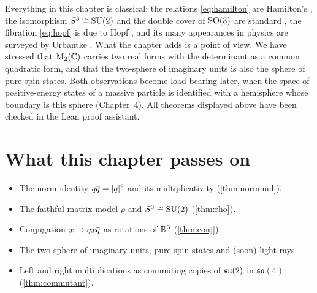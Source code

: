 \begin{litbox}
Everything in this chapter is classical: the relations \eqref{eq:hamilton} are Hamilton's \cite{Hamilton1844}, the isomorphism $S^3\cong\mathrm{SU}(2)$ and the double cover of $\mathrm{SO}(3)$ are standard \cite{ConwaySmith}, the fibration \eqref{eq:hopf} is due to Hopf \cite{Hopf1931}, and its many appearances in physics are surveyed by Urbantke \cite{Urbantke2003}. What the chapter adds is a point of view. We have stressed that $\mathrm{M}_2(\mathbb{C})$ carries two real forms with the determinant as a common quadratic form, and that the two-sphere of imaginary units is also the sphere of pure spin states. Both observations become load-bearing later, when the space of positive-energy states of a massive particle is identified with a hemisphere whose boundary is this sphere (Chapter~4). All theorems displayed above have been checked in the Lean proof assistant.
\end{litbox}

\section*{What this chapter passes on}
\begin{itemize}[nosep]
\item The norm identity $q\overline{q}=|q|^2$ and its multiplicativity (\cref{thm:normmul}).
\item The faithful matrix model $\rho$ and $S^3\cong\mathrm{SU}(2)$ (\cref{thm:rho}).
\item Conjugation $x\mapsto qx\overline{q}$ as rotations of $\mathbb{R}^3$ (\cref{thm:conj}).
\item The two-sphere of imaginary units, pure spin states and (soon) light rays.
\item Left and right multiplications as commuting copies of $\mathfrak{su}(2)$ in $\mathfrak{so}(4)$ (\cref{thm:commutant}).
\end{itemize}

